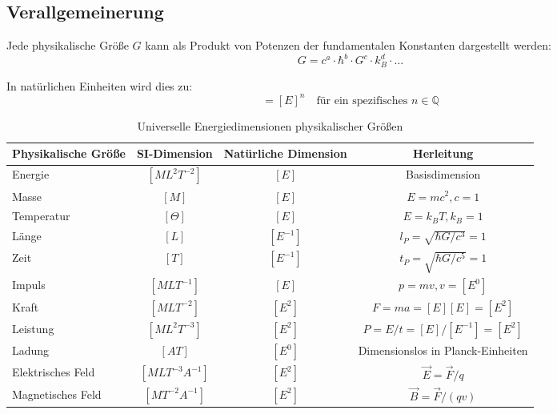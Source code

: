 	\subsection{Verallgemeinerung}
	
	Jede physikalische Größe $G$ kann als Produkt von Potenzen der fundamentalen Konstanten dargestellt werden:
	\begin{equation}
		G = c^a \cdot \hbar^b \cdot G^c \cdot k_B^d \cdot \ldots
	\end{equation}
	
	In natürlichen Einheiten wird dies zu:
	\begin{equation}
		[G] = [E]^n \quad \text{für ein spezifisches } n \in \mathbb{Q}
	\end{equation}
	
	\begin{table}[htbp]
		\centering
		\begin{adjustbox}{width=0.9\textwidth}
			\begin{tabular}{lccc}
				\toprule
				\textbf{Physikalische Größe} & \textbf{SI-Dimension} & \textbf{Natürliche Dimension} & \textbf{Herleitung} \\
				\midrule
				Energie & $[ML^2T^{-2}]$ & $[E]$ & Basisdimension \\
				Masse & $[M]$ & $[E]$ & $E = mc^2, c = 1$ \\
				Temperatur & $[\Theta]$ & $[E]$ & $E = k_BT, k_B = 1$ \\
				Länge & $[L]$ & $[E^{-1}]$ & $l_P = \sqrt{\hbar G/c^3} = 1$ \\
				Zeit & $[T]$ & $[E^{-1}]$ & $t_P = \sqrt{\hbar G/c^5} = 1$ \\
				Impuls & $[MLT^{-1}]$ & $[E]$ & $p = mv, v = [E^0]$ \\
				Kraft & $[MLT^{-2}]$ & $[E^2]$ & $F = ma = [E][E] = [E^2]$ \\
				Leistung & $[ML^2T^{-3}]$ & $[E^2]$ & $P = E/t = [E]/[E^{-1}] = [E^2]$ \\
				Ladung & $[AT]$ & $[E^0]$ & Dimensionslos in Planck-Einheiten \\
				Elektrisches Feld & $[MLT^{-3}A^{-1}]$ & $[E^2]$ & $\vec{E} = \vec{F}/q$ \\
				Magnetisches Feld & $[MT^{-2}A^{-1}]$ & $[E^2]$ & $\vec{B} = \vec{F}/(qv)$ \\
				\bottomrule
			\end{tabular}
		\end{adjustbox}
		\caption{Universelle Energiedimensionen physikalischer Größen}
		\label{tab:energiedimensionen}
	\end{table}
	
